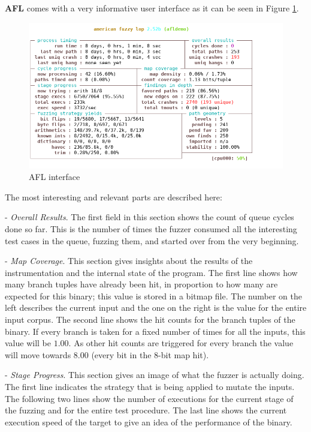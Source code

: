 \documentclass[../main.tex]{subfiles}
\begin{document}
\textbf{AFL} comes with a very informative user interface as it can be seen in Figure \ref{fig:aflint}.

\begin{figure}[htp]
  \centering
  \hspace*{0.3in}
  \includegraphics[scale=0.7]{images/afl-test_x86_64-white.png}
  \caption{AFL interface}
  \label{fig:aflint}
\end{figure}

The most interesting and relevant parts are described here:

- \textit{Overall Results}. The first field in this section shows the count of queue cycles done so far. This is the number of times the fuzzer consumed all the interesting test cases in the queue, fuzzing them, and started over from the very beginning.

- \textit{Map Coverage}. This section gives insights about the results of the instrumentation and the internal state of the program. The first line shows how many branch tuples have already been hit, in proportion to how many are expected for this binary; this value is stored in a bitmap file. The number on the left describes the current input and the one on the right is the value for the entire input corpus.
The second line shows the hit counts for the branch tuples of the binary. If every branch is taken for a fixed number of times for all the inputs, this value will be  $1.00$. As other hit counts are triggered for every branch the value will move towards $8.00$ (every bit in the 8-bit map hit).

- \textit{Stage Progress}. This section gives an image of what the fuzzer is actually doing. The first line indicates the strategy that is being applied to mutate the inputs. The following two lines show the number of executions for the current stage of the fuzzing and for the entire test procedure. The last line shows the current execution speed of the target to give an idea of the performance of the binary.
\end{document}
